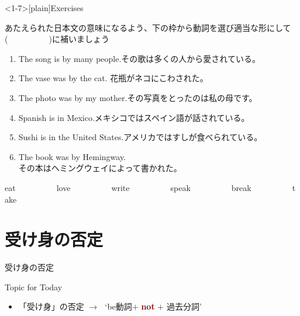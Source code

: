 \documentclass[aspectratio=169,xcolor={dvipsnames,table}]{beamer}
\newcommand{\myaudio}[1]{\href{#1}{\faVolumeUp}}
\begin{document}
\begin{frame}<1-7>[plain]{Exercises}

あたえられた日本文の意味になるよう、下の枠から動詞を選び適当な形にして(~~~~~~~~~~)に補いましょう\hfill\myaudio{./audio/051_passive_05.mp3}

\begin{enumerate}
 \item The song is  by many people.その歌は多くの人から愛されている。
 \item The vase was  by the cat. 花瓶がネコにこわされた。
 \item The photo was  by my mother.その写真をとったのは私の母です。
 \item Spanish is  in Mexico.メキシコではスペイン語が話されている。
 \item Sushi is  in the United States.アメリカではすしが食べられている。
 \item The book was  by Hemingway. \\その本はヘミングウェイによって書かれた。
\end{enumerate}

\begin{tcolorbox}\centering
 eat~~~~~~~~~~love~~~~~~~~~~write~~~~~~~~~~speak~~~~~~~~~~break~~~~~~~~~~take
\end{tcolorbox}
\end{frame}
\section{受け身の否定}
\begin{frame}[plain]{受け身の否定}
\Large

\hfill{}


\vfill

\hfill\myaudio{./audio/051_passive_06.mp3}

\begin{exampleblock}{Topic for Today}
\begin{itemize}[square]\small
 \item 「受け身」の否定 $\longrightarrow$\,\,\,\,`be動詞$+$ \textcolor{Maroon}{{\bfseries not}} $+$ 過去分詞'
\end{itemize}
     \end{exampleblock}

\end{frame}
\end{document}
